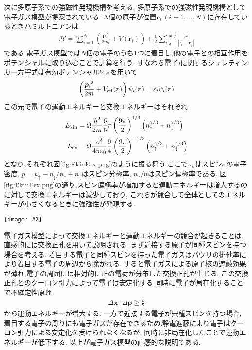 \documentclass[uplatex,a4j,11pt,dvipdfmx]{jsarticle}
\makeatletter
\def\fgcaption{\def\@captype{figure}\caption}
\newcommand{\mfig}[3][width=15cm]{
\begin{center}
\texttt{[image: \#2]}
\fgcaption{#3 \label{fig:#2}}
\end{center}
}
\makeatother
\begin{document}
次に多原子系での強磁性発現機構を考える.
多原子系での強磁性発現機構として電子ガス模型が提案されている.
$N$個の原子が位置${\bm r_i}\ (i=1,\ldots,N)$に存在しているときハミルトニアンは
\begin{align}
  \mathcal{H}=\sum_{i=1}^N\left(\frac{{\bm p_i}^2}{2m_i}+V({\bm r_i})\right)+\frac{1}{2}\sum_{i,j}^{i\neq j}\frac{e^2}{|{\bm r_i}-{\bm r_j}|}
\end{align}
である.電子ガス模型では$N$個の電子のうち1つに着目し,他の電子との相互作用をポテンシャルに取り込むことで計算を行う.
すなわち電子$i$に関するシュレディンガー方程式は有効ポテンシャル$V_{\rm eff}$を用いて
\begin{align}
  \left(\frac{{\bm p_i}^2}{2m}+V_{\rm eff}(\bm r)\right)\psi_i(\bm r)=\varepsilon_i\psi_i(\bm r)
\end{align}
この元で電子の運動エネルギーと交換エネルギーはそれぞれ
\begin{align}
  E_{\rm kin}&=\Omega\frac{\hbar^2}{2m}\frac{6}{5}\pi\left(\frac{9\pi}{2}\right)^{1/3}\left(n_\uparrow^{5/3}+n_\downarrow^{5/3}\right)\\
  E_{\rm ex}&=\Omega\frac{e^2}{4\pi\varepsilon_0}\frac{9}{4}\left(\frac{9\pi}{2}\right)^{-1/3}\left(n_\uparrow^{4/3}+n_\downarrow^{4/3}\right)
\end{align}
となり,それぞれ図\ref{fig:EkinEex.png}のように振る舞う.ここで$n_\sigma$はスピン$\sigma$の電子密度, $p=n_\uparrow-n_\downarrow/n_\uparrow+n_\downarrow$はスピン分極率, $n_\uparrow/n$はスピン偏極率である.
図\ref{fig:EkinEex.png}の通り,スピン偏極率が増加すると運動エネルギーは増大するのに対して交換エネルギーは減少しており,
これらが競合して全体としてのエネルギーが小さくなるときに強磁性が発現する.
\mfig[width=12cm]{EkinEex.png}{$E_{\rm kin}$と$E_{\rm ex}$(授業スライドから引用)}

電子ガス模型によって交換エネルギーと運動エネルギーの競合が起きることは,直感的には交換正孔を用いて説明される.
まず近接する原子が同種スピンを持つ場合を考える.
着目する電子と同種スピンを持った電子ガスはパウリの排他率により着目する電子の周辺から除かれる.
すると電子ガスによる原子核の遮蔽効果が薄れ,電子の周囲には相対的に正の電荷が分布した交換正孔が生じる.
この交換正孔とのクーロン引力によって電子は安定化する.同時に電子が局在化することで不確定性原理
\begin{align}
  \Delta {\bm x}\cdot\Delta {\bm p}\geq\frac{\hbar}{2}
\end{align}
から運動エネルギーが増大する.
一方で近接する電子が異種スピンを持つ場合,
着目する電子の周りにも電子ガスが存在できるため,静電遮蔽により電子はクーロン引力による安定化を受けられなくなるが,
同時に非局在化したことで運動エネルギーが低下する.
以上が電子ガス模型の直感的な説明である.
\end{document}
